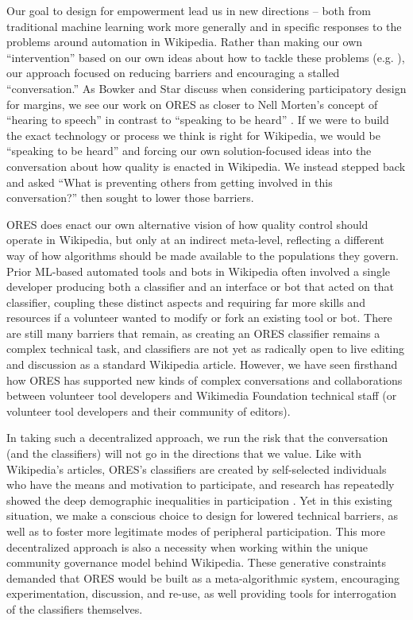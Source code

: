 Our goal to design for empowerment lead us in new directions -- both from traditional machine learning work more generally and in specific responses to the problems around automation in Wikipedia. Rather than making our own ``intervention'' based on our own ideas about how to tackle these problems (e.g. \cite{halfaker2014snuggle}), our approach focused on reducing barriers and encouraging a stalled ``conversation.'' As Bowker and Star discuss when considering participatory design for margins\cite{bowker1999sorting}, we see our work on ORES as closer to Nell Morten's concept of ``hearing to speech'' in contrast to ``speaking to be heard'' \cite{morton1985journey}. If we were to build the exact technology or process we think is right for Wikipedia, we would be ``speaking to be heard'' and forcing our own solution-focused ideas into the conversation about how quality is enacted in Wikipedia. We instead stepped back and asked ``What is preventing others from getting involved in this conversation?'' then sought to lower those barriers. 

ORES does enact our own alternative vision of how quality control should operate in Wikipedia, but only at an indirect meta-level, reflecting a different way of how algorithms should be made available to the populations they govern. Prior ML-based automated tools and bots in Wikipedia often involved a single developer producing both a classifier and an interface or bot that acted on that classifier, coupling these distinct aspects and requiring far more skills and resources if a volunteer wanted to modify or fork an existing tool or bot. There are still many barriers that remain, as creating an ORES classifier remains a complex technical task, and classifiers are not yet as radically open to live editing and discussion as a standard Wikipedia article. However, we have seen firsthand how ORES has supported new kinds of complex conversations and collaborations between volunteer tool developers and Wikimedia Foundation technical staff (or volunteer tool developers and their community of editors).

In taking such a decentralized approach, we run the risk that the conversation (and the classifiers) will not go in the directions that we value. Like with Wikipedia's articles, ORES's classifiers are created by self-selected individuals who have the means and motivation to participate, and research has repeatedly showed the deep demographic inequalities in participation . Yet in this existing situation, we make a conscious choice to design for lowered technical barriers, as well as to foster more legitimate modes of peripheral participation. This more decentralized approach is also a necessity when working within the unique community governance model behind Wikipedia.  These generative constraints demanded that ORES would be built as a meta-algorithmic system, encouraging experimentation, discussion, and re-use, as well providing tools for interrogation of the classifiers themselves. 

